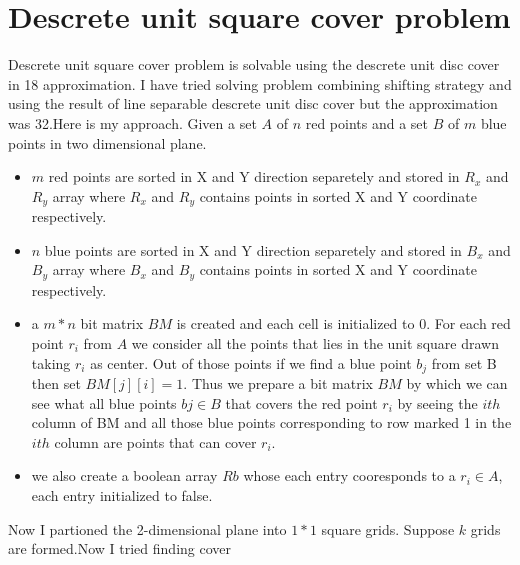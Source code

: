 \documentclass[10pt,a4wide]{report}
\theoremstyle{plain}
\theoremstyle{definition}
\theoremstyle{remark}
\begin{document}
\chapter{Descrete unit square cover problem}
                            Descrete unit square cover problem is solvable using the descrete unit disc cover \cite{GRALB12} in 18 approximation.
                            I have tried solving problem combining shifting strategy \cite{DW85} and using the result of line separable descrete 
                            unit disc cover \cite{FGRSR10} but the approximation was 32.Here is my approach.
                            Given a set $A$ of $n$ red points and a set $B$ of $m$ blue points in two dimensional plane.
                            \begin{itemize}
                             \item $m$ red points are sorted in X and Y direction separetely and stored in $R_{x}$ and $R_{y}$ array where $R_{x}$ and 
                                   $R_{y}$ contains points in sorted X and Y coordinate respectively.
                             \item $n$ blue points are sorted in X and Y direction separetely and stored in $B_{x}$ and $B_{y}$ array where $B_{x}$ and 
                                   $B_{y}$ contains points in sorted X and Y coordinate respectively.
                             \item a $m \ast n$ bit matrix $BM$ is created and each cell is initialized to 0. For each red point $r_{i}$ from  $A$ 
                                         we consider all the points that lies in the unit square drawn taking $r_{i}$ as center. Out of those points 
                                         if we find a blue point $b_{j}$ from set B then set $BM[j][i]=1$. Thus we prepare a bit matrix $BM$ by 
                                         which we can see what all blue points $b{j} \in B$ that covers the red point $r_{i}$ by seeing the $ith$ column
                                         of BM and all those blue points corresponding to row marked 1 in the $ith$ column are points that can cover
                                         $r_{i}$.
                              \item we also create a boolean array $Rb$ whose each entry cooresponds to a $r_{i} \in A$, each entry initialized to false.
                            \end{itemize}
                            Now I partioned the 2-dimensional plane into $1*1$ square grids. Suppose $k$ grids are formed.Now I tried finding cover
\end{document}
